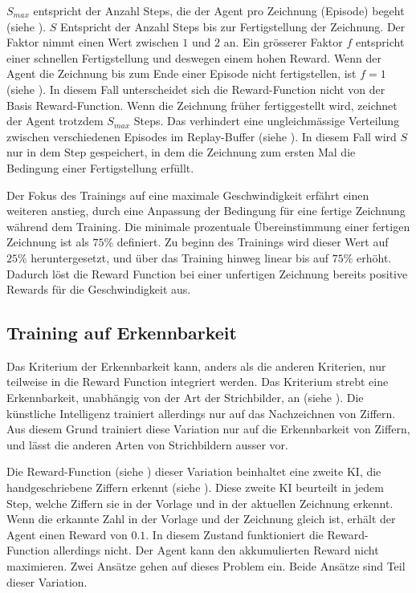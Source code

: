 $S_{max}$ entspricht der Anzahl Steps, die der Agent pro Zeichnung (Episode)
begeht (siehe ). $S$ Entspricht der Anzahl Steps
bis zur Fertigstellung der Zeichnung. Der Faktor nimmt einen Wert zwischen $1$
und $2$ an. Ein grösserer Faktor $f$ entspricht einer schnellen Fertigstellung
und deswegen einem hohen Reward. Wenn der Agent die Zeichnung bis zum Ende einer
Episode nicht fertigstellen, ist $f = 1$ (siehe ). In
diesem Fall unterscheidet sich die Reward-Function nicht von der Basis
Reward-Function. Wenn die Zeichnung früher fertiggestellt wird, zeichnet der
Agent trotzdem $S_{max}$ Steps. Das verhindert eine ungleichmässige Verteilung
zwischen verschiedenen Episodes im Replay-Buffer (siehe ).
In diesem Fall wird $S$ nur in dem Step gespeichert, in dem die Zeichnung zum
ersten Mal die Bedingung einer Fertigstellung erfüllt.   

Der Fokus des Trainings auf eine maximale Geschwindigkeit erfährt einen weiteren
anstieg, durch eine Anpassung der Bedingung für eine fertige Zeichnung während
dem Training. Die minimale prozentuale Übereinstimmung einer fertigen Zeichnung
ist als $75\%$ definiert. Zu beginn des Trainings wird dieser Wert auf $25\%$  %
heruntergesetzt, und über das Training hinweg linear bis auf $75\%$ erhöht.
Dadurch löst die Reward Function bei einer unfertigen Zeichnung bereits positive
Rewards für die Geschwindigkeit aus.


\subsection{Training auf Erkennbarkeit}
\label{sub:m_var_rec}
Das Kriterium der Erkennbarkeit kann, anders als die anderen Kriterien, nur
teilweise in die Reward Function integriert werden. Das Kriterium strebt eine
Erkennbarkeit, unabhängig von der Art der Strichbilder, an (siehe
). Die künstliche Intelligenz trainiert allerdings nur
auf das Nachzeichnen von Ziffern. Aus diesem Grund trainiert diese Variation nur
auf die Erkennbarkeit von Ziffern, und lässt die anderen Arten von Strichbildern
ausser vor. 

Die Reward-Function (siehe ) dieser Variation beinhaltet
eine zweite KI, die handgeschriebene Ziffern erkennt (siehe
). Diese zweite KI beurteilt in jedem Step, welche
Ziffern sie in der Vorlage und in der aktuellen  %
Zeichnung erkennt. Wenn die erkannte Zahl in der Vorlage und der Zeichnung
gleich ist, erhält der Agent einen Reward von $0.1$. In diesem Zustand
funktioniert die Reward-Function allerdings nicht. Der Agent kann den
akkumulierten Reward nicht maximieren. Zwei Ansätze gehen auf dieses Problem
ein. Beide Ansätze sind Teil dieser Variation.

